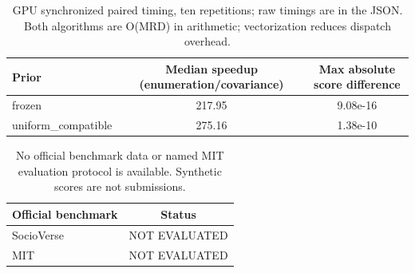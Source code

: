 \begin{table}[t]
\centering
\small
\caption{GPU synchronized paired timing, ten repetitions; raw timings are in the JSON. Both algorithms are O(MRD) in arithmetic; vectorization reduces dispatch overhead.}
\begin{tabular}{lcc}
\toprule
Prior & Median speedup (enumeration/covariance) & Max absolute score difference \\
\midrule
frozen & 217.95 & 9.08e-16 \\
uniform\_compatible & 275.16 & 1.38e-10 \\
\bottomrule
\end{tabular}
\end{table}
\begin{table}[t]
\centering
\small
\caption{No official benchmark data or named MIT evaluation protocol is available. Synthetic scores are not submissions.}
\begin{tabular}{lc}
\toprule
Official benchmark & Status \\
\midrule
SocioVerse & NOT EVALUATED \\
MIT & NOT EVALUATED \\
\bottomrule
\end{tabular}
\end{table}

